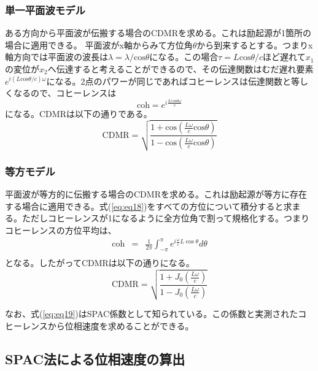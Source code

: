 \documentclass[a4paper,12pt]{book}
\begin{document}
\subsubsection{単一平面波モデル}
ある方向から平面波が伝搬する場合のCDMRを求める。これは励起源が1箇所の場合に適用できる。
平面波がx軸からみて方位角$\theta$から到来するとする。つまりx軸方向では平面波の波長は$\lambda=\lambda/\mathrm{cos}\theta$になる。この場合$\tau=L\mathrm{cos}\theta/c$ほど遅れて$x_1$の変位が$x_2$へ伝達すると考えることができるので、その伝達関数はむだ遅れ要素$e^{i(L\mathrm{cos}\theta/c)\omega}$になる。2点のパワーが同じであればコヒーレンスは伝達関数と等しくなるので、コヒーレンスは
\begin{equation}
  \mathrm{coh}=e^{i\frac{L\mathrm{cos}\theta\omega}{c}}
\end{equation}
になる。CDMRは以下の通りである。
\begin{equation}  \label{eq:eq18}
  \mathrm{CDMR} = \sqrt{\frac{1+\mathrm{cos}(\frac{L\omega}{c}\mathrm{cos}\theta)}{1-\mathrm{cos}(\frac{L\omega}{c}\mathrm{cos}\theta)}}
\end{equation}



\subsubsection{等方モデル}
平面波が等方的に伝搬する場合のCDMRを求める。これは励起源が等方に存在する場合に適用できる。式(\ref{eq:eq18})をすべての方位について積分すると求まる。ただしコヒーレンスが1になるように全方位角で割って規格化する。つまりコヒーレンスの方位平均は、
\begin{eqnarray} \label{eq:eq19}
  \mathrm{coh} &=& \frac{1}{2\pi} \int_{-\pi}^{\pi} e^{i\frac{\omega}{c} L\cos \theta} d \theta \\
\end{eqnarray}
となる。したがってCDMRは以下の通りになる。
\begin{equation}  \label{eq:eq20}
  \mathrm{CDMR} = \sqrt{\frac{1+J_0(\frac{L\omega}{c})}{1-J_0(\frac{L\omega}{c})}}
\end{equation}

なお、式(\ref{eq:eq19})はSPAC係数として知られている。この係数と実測されたコヒーレンスから位相速度を求めることができる。

\subsection{SPAC法による位相速度の算出}
\end{document}
